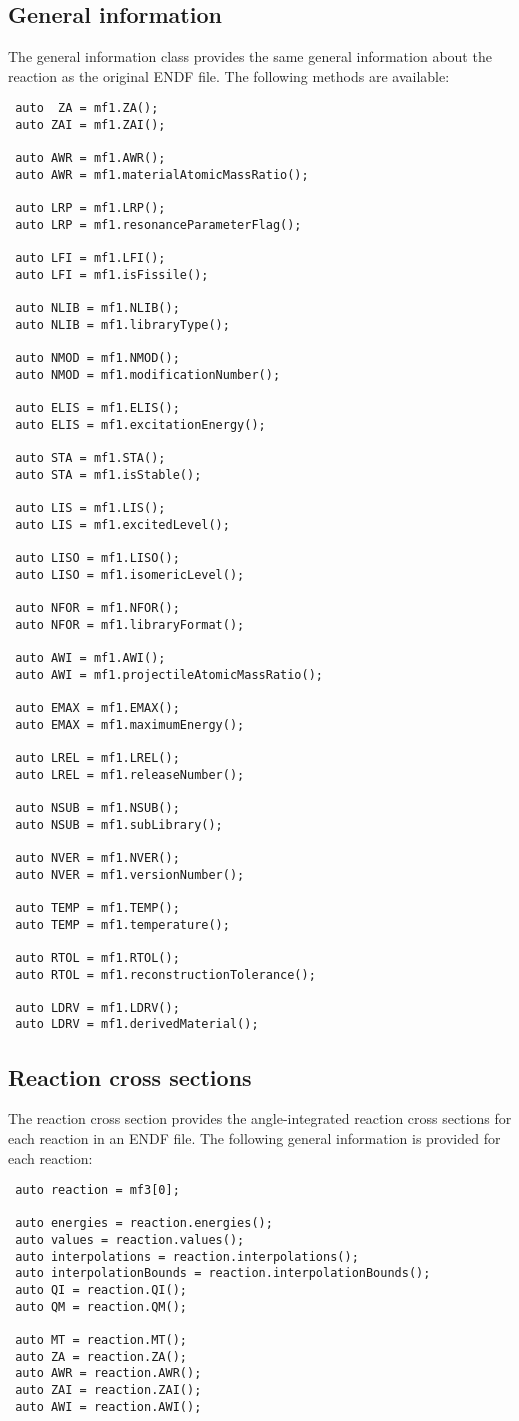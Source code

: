 \documentclass[../main.tex]{subfiles}
\begin{document}
\subsection{General information}
The general information class provides the same general information about the reaction as the original ENDF file. The following methods are available:
\begin{lstlisting}
 auto  ZA = mf1.ZA();
 auto ZAI = mf1.ZAI();
  
 auto AWR = mf1.AWR();
 auto AWR = mf1.materialAtomicMassRatio();

 auto LRP = mf1.LRP();
 auto LRP = mf1.resonanceParameterFlag();

 auto LFI = mf1.LFI();
 auto LFI = mf1.isFissile();

 auto NLIB = mf1.NLIB();
 auto NLIB = mf1.libraryType();

 auto NMOD = mf1.NMOD();
 auto NMOD = mf1.modificationNumber();

 auto ELIS = mf1.ELIS();
 auto ELIS = mf1.excitationEnergy();

 auto STA = mf1.STA();
 auto STA = mf1.isStable();

 auto LIS = mf1.LIS();
 auto LIS = mf1.excitedLevel();

 auto LISO = mf1.LISO();
 auto LISO = mf1.isomericLevel();

 auto NFOR = mf1.NFOR();
 auto NFOR = mf1.libraryFormat();

 auto AWI = mf1.AWI();
 auto AWI = mf1.projectileAtomicMassRatio();

 auto EMAX = mf1.EMAX();
 auto EMAX = mf1.maximumEnergy();

 auto LREL = mf1.LREL();
 auto LREL = mf1.releaseNumber();

 auto NSUB = mf1.NSUB();
 auto NSUB = mf1.subLibrary();

 auto NVER = mf1.NVER();
 auto NVER = mf1.versionNumber();

 auto TEMP = mf1.TEMP();
 auto TEMP = mf1.temperature();

 auto RTOL = mf1.RTOL();
 auto RTOL = mf1.reconstructionTolerance();

 auto LDRV = mf1.LDRV();
 auto LDRV = mf1.derivedMaterial();
\end{lstlisting}


\subsection{Reaction cross sections}
The reaction cross section provides the angle-integrated reaction cross sections for each reaction in an ENDF file. The following general information is provided for each reaction:
\begin{lstlisting}
 auto reaction = mf3[0];

 auto energies = reaction.energies();
 auto values = reaction.values();
 auto interpolations = reaction.interpolations();
 auto interpolationBounds = reaction.interpolationBounds();
 auto QI = reaction.QI();
 auto QM = reaction.QM();

 auto MT = reaction.MT();
 auto ZA = reaction.ZA();
 auto AWR = reaction.AWR();
 auto ZAI = reaction.ZAI();
 auto AWI = reaction.AWI();
\end{lstlisting}
\end{document}
